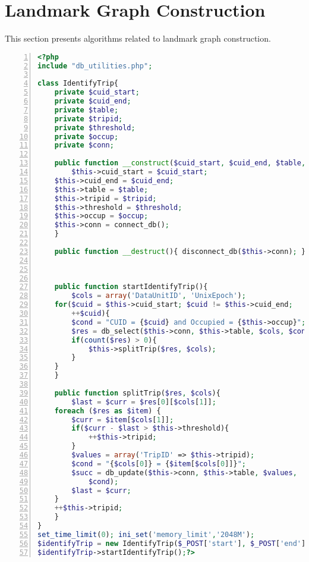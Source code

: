 \section{Landmark Graph Construction}
This section presents algorithms related to landmark graph construction. 
\begin{lstlisting}[language = PHP, caption = {Trip Identification}, label = {AList:trip_identification}, frame=single, numbers=left, stepnumber=1]
<?php
include "db_utilities.php";

class IdentifyTrip{
    private $cuid_start;
    private $cuid_end;
    private $table;
    private $tripid;
    private $threshold;
    private $occup;
    private $conn;
    
    public function __construct($cuid_start, $cuid_end, $table, $tripid, $threshold, $occup){
    	$this->cuid_start = $cuid_start;
	$this->cuid_end = $cuid_end;
	$this->table = $table;
	$this->tripid = $tripid;
	$this->threshold = $threshold;
	$this->occup = $occup;
	$this->conn = connect_db();
    }
    
    public function __destruct(){ disconnect_db($this->conn); }



    public function startIdentifyTrip(){
    	$cols = array('DataUnitID', 'UnixEpoch');
	for($cuid = $this->cuid_start; $cuid != $this->cuid_end; 
		++$cuid){
	    $cond = "CUID = {$cuid} and Occupied = {$this->occup}";
	    $res = db_select($this->conn, $this->table, $cols, $cond);
	    if(count($res) > 0){
	        $this->splitTrip($res, $cols);
	    }
	}
    }
    
    public function splitTrip($res, $cols){
    	$last = $curr = $res[0][$cols[1]];
	foreach ($res as $item) {
	    $curr = $item[$cols[1]];
	    if($curr - $last > $this->threshold){
	    	++$this->tripid;
	    }
	    $values = array('TripID' => $this->tripid);
	    $cond = "{$cols[0]} = {$item[$cols[0]]}";
	    $succ = db_update($this->conn, $this->table, $values, 
	    	$cond);
	    $last = $curr;
	}
	++$this->tripid;
    }
}
set_time_limit(0); ini_set('memory_limit','2048M');
$identifyTrip = new IdentifyTrip($_POST['start'], $_POST['end'], $_POST['table'], $_POST['tripid'], $_POST['threshold'], $_POST['occup']);
$identifyTrip->startIdentifyTrip();?>
\end{lstlisting}

